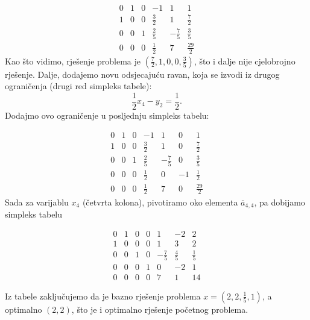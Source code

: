 \documentclass[a4paper, utf8, 11pt, colorlinks]{article}
\begin{document}
$$
\begin{array}{ccccc|c}
    0    &  1  &   0 &   -1  &            1 & 1                  \\
    1    &  0  &  0 &    \frac{3}{2}  &  1 & \frac{7}{2}\\ 
    0    &  0  &  1  &   \frac{2}{5}    &  -\frac{7}{5} & \frac{3}{5}  \\
     \hline 
    0    &  0  &  0   &    \frac{1}{2}  &  7  &    \frac{29}{2}
\end{array}
$$
Kao što vidimo, rješenje problema je $(\frac{7}{2}, 1, 0, 0, \frac{3}{5})$, što i dalje nije cjelobrojno rješenje. Dalje, dodajemo novu odsjecajuću ravan, koja se izvodi iz drugog ograničenja (drugi red simpleks tabele): 
$$ \frac{1}{2} x_4 - y_2 = \frac{1}{2}.$$
Dodajmo ovo ograničenje u posljednju simpleks tabelu:

$$
\begin{array}{cccccc|c}
    0    &  1  &   0 &   -1  &            1 & 0 & 1                  \\
    1    &  0  &  0 &    \frac{3}{2}    &  1 & 0 &  \frac{7}{2}\\ 
    0    &  0  &  1  &   \frac{2}{5}    &  -\frac{7}{5} &  0 & \frac{3}{5}  \\
    0    & 0   &  0  &   \frac{1}{2}    & 0     & -1 & \frac{1}{2} \\
     \hline 
    0    &  0  &  0   &    \frac{1}{2}  &  7  &   0 &  \frac{29}{2}
\end{array}
$$
Sada za varijablu $x_4$ (četvrta kolona), pivotiramo oko elementa $\overline{a}_{4,4}$, pa dobijamo simpleks tabelu 

$$
\begin{array}{cccccc|c}
0 &  1   &  0  &  0  &    1             &    -2           &   2         \\
1 &  0   &  0  &  0  &    1             &     3           &   2         \\
0 &  0   &  1  &  0  &   -\frac{7}{5}   &     \frac{4}{5} &   \frac{1}{5}\\
0 &  0   &  0  &  1  &   0              &    -2           &   1   \\ \hline
0 &  0   &  0  &  0  &   7              &     1           &   14
\end{array}
$$


Iz tabele zaključujemo da je bazno rješenje problema 
$x=(2,2, \frac{1}{5}, 1)$, a optimalno $(2, 2)$, što je i optimalno rješenje početnog problema. 
\end{document}

